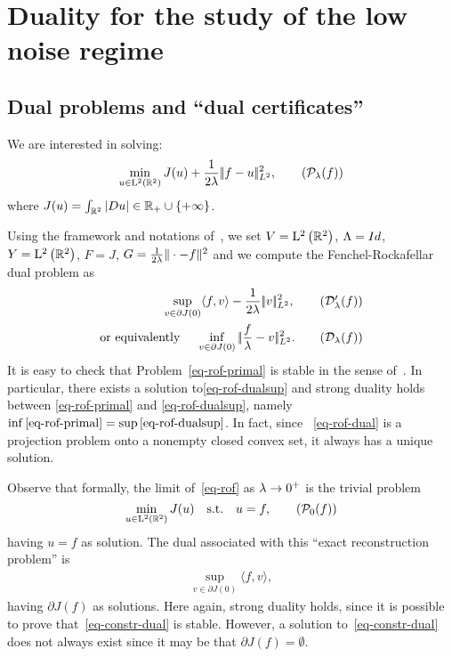 
\section{Duality for the study of the low noise regime}\label{sec:duality}

\subsection{Dual problems and ``dual certificates''}

We are interested in solving:
\begin{equation}
\min_{u\in \LDD} J(u) + \frac{1}{2\la}\normLdeux{f-u}^2,\tag{$\Pp_\la(f)$}\label{eq-rof-primal}\end{equation}
where $J(u)=\int_{\mathbb{R}^2} |Du|\in \mathbb{R}_+\cup\{+\infty\}$.


Using the framework and notations of~\cite{EkelandTemam}, we set $V=\mathrm{L}^2\left(\mathbb{R}^2\right)$, $\Lambda=Id$, $Y=\mathrm{L}^2\left(\mathbb{R}^2\right)$, $F=J$, $G=\frac{1}{2\lambda}\|\cdot-f \|^2$ and we compute the Fenchel-Rockafellar dual problem as
\begin{align}
  \sup_{v\in \partial J(0)} \langle f,v\rangle -\frac{1}{2\la} \normLdeux{v}^2, \tag{$\Dd'_\la(f)$}\label{eq-rof-dualsup}\\
  \mbox{or equivalently }\quad \inf_{v\in \partial J(0)} \normLdeux{\frac{f}{\la} - v}^2. \tag{$\Dd_\la(f)$}\label{eq-rof-dual}
\end{align}
It is easy to check that Problem~\eqref{eq-rof-primal} is stable in the sense of~\cite{EkelandTemam}. In particular, there exists a solution to\eqref{eq-rof-dualsup} and strong duality holds between \eqref{eq-rof-primal} and \eqref{eq-rof-dualsup}, namely $\inf\eqref{eq-rof-primal} = \sup \eqref{eq-rof-dualsup}$. In fact, since ~\eqref{eq-rof-dual} is a projection problem onto a nonempty closed convex set,  it always has a unique solution. 

Observe that formally, the limit of~\eqref{eq-rof} as $\lambda\to 0^+$ is the trivial problem
\begin{equation}
\min_{u\in \LDD} J(u) \quad \mbox{s.t.}\quad  u=f,
\tag{$\Pp_0(f)$}\label{eq:rof-noiseless}
\end{equation}
having $u=f$ as solution.
The dual associated with this ``exact reconstruction problem'' is
\begin{align}
  \sup_{v\in \partial J(0)} \langle f,v\rangle, \tag{$\Dd_0(f)$}\label{eq-constr-dual}
\end{align}
having $\partial J(f)$ as solutions.
Here again, strong duality holds, since it is possible to prove that~\eqref{eq-constr-dual} is stable. However, a solution to~\eqref{eq-constr-dual} does not always exist since it may be that $\partial J(f)=\emptyset$.

